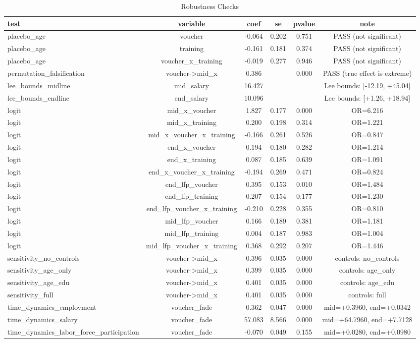 \begin{table}[htbp]
\centering
\caption{Robustness Checks}
\label{tab:robustness}
\begin{tabular}{lccccc}
\hline\hline
test & variable & coef & se & pvalue & note \\
\hline
placebo\_age & voucher & -0.064 & 0.202 & 0.751 & PASS (not significant) \\
placebo\_age & training & -0.161 & 0.181 & 0.374 & PASS (not significant) \\
placebo\_age & voucher\_x\_training & -0.019 & 0.277 & 0.946 & PASS (not significant) \\
permutation\_falsification & voucher->mid\_x & 0.386 &  & 0.000 & PASS (true effect is extreme) \\
lee\_bounds\_midline & mid\_salary & 16.427 &  &  & Lee bounds: [-12.19, +45.04] \\
lee\_bounds\_endline & end\_salary & 10.096 &  &  & Lee bounds: [+1.26, +18.94] \\
logit & mid\_x\_voucher & 1.827 & 0.177 & 0.000 & OR=6.216 \\
logit & mid\_x\_training & 0.200 & 0.198 & 0.314 & OR=1.221 \\
logit & mid\_x\_voucher\_x\_training & -0.166 & 0.261 & 0.526 & OR=0.847 \\
logit & end\_x\_voucher & 0.194 & 0.180 & 0.282 & OR=1.214 \\
logit & end\_x\_training & 0.087 & 0.185 & 0.639 & OR=1.091 \\
logit & end\_x\_voucher\_x\_training & -0.194 & 0.269 & 0.471 & OR=0.824 \\
logit & end\_lfp\_voucher & 0.395 & 0.153 & 0.010 & OR=1.484 \\
logit & end\_lfp\_training & 0.207 & 0.154 & 0.177 & OR=1.230 \\
logit & end\_lfp\_voucher\_x\_training & -0.210 & 0.228 & 0.355 & OR=0.810 \\
logit & mid\_lfp\_voucher & 0.166 & 0.189 & 0.381 & OR=1.181 \\
logit & mid\_lfp\_training & 0.004 & 0.187 & 0.983 & OR=1.004 \\
logit & mid\_lfp\_voucher\_x\_training & 0.368 & 0.292 & 0.207 & OR=1.446 \\
sensitivity\_no\_controls & voucher->mid\_x & 0.396 & 0.035 & 0.000 & controls: no\_controls \\
sensitivity\_age\_only & voucher->mid\_x & 0.399 & 0.035 & 0.000 & controls: age\_only \\
sensitivity\_age\_edu & voucher->mid\_x & 0.401 & 0.035 & 0.000 & controls: age\_edu \\
sensitivity\_full & voucher->mid\_x & 0.401 & 0.035 & 0.000 & controls: full \\
time\_dynamics\_employment & voucher\_fade & 0.362 & 0.047 & 0.000 & mid=+0.3960, end=+0.0342 \\
time\_dynamics\_salary & voucher\_fade & 57.083 & 8.566 & 0.000 & mid=+64.7960, end=+7.7128 \\
time\_dynamics\_labor\_force\_participation & voucher\_fade & -0.070 & 0.049 & 0.155 & mid=+0.0280, end=+0.0980 \\
\hline\hline
\end{tabular}
\end{table}